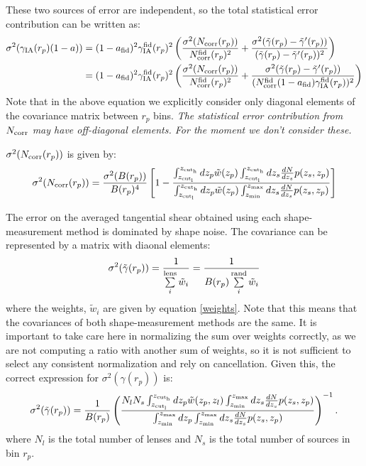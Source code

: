 \documentclass[onecolumn,amsmath,aps,fleqn, superscriptaddress]{revtex4}
\begin{document}
These two sources of error are independent, so the total statistical error contribution can be written as:
\begin{align}
\sigma^2(\gamma_{\rm IA}(r_p)(1-a)) &= (1-a_{\rm fid})^2\gamma_{\rm IA}^{\rm fid}(r_p)^2\left(\frac{\sigma^2(N_{\rm corr}(r_p))}{N_{\rm corr}^{\rm fid}(r_p)^2} + \frac{\sigma^2(\tilde{\gamma}(r_p) - \tilde{\gamma}^\prime(r_p))}{(\tilde{\gamma}(r_p) - \tilde{\gamma}^\prime(r_p))^2}\right) \nonumber \\
&= (1-a_{\rm fid})^2\gamma_{\rm IA}^{\rm fid}(r_p)^2\left(\frac{\sigma^2(N_{\rm corr}(r_p))}{N_{\rm corr}^{\rm fid}(r_p)^2} + \frac{\sigma^2(\tilde{\gamma}(r_p) - \tilde{\gamma}^\prime(r_p))}{(N_{\rm corr}^{\rm fid}(1-a_{\rm fid})\gamma_{\rm IA}^{\rm fid}(r_p))^2}\right)
\label{error}
\end{align}
Note that in the above equation we explicitly consider only diagonal elements of the covariance matrix between $r_p$ bins. {\it The statistical error contribution from $N_{\rm corr}$ may have off-diagonal elements. For the moment we don't consider these.}

$\sigma^2(N_{\rm corr}(r_p))$ is given by:
\begin{equation}
\sigma^2(N_{\rm corr}(r_p)) = \frac{\sigma^2(B(r_p))}{B(r_p)^4}\left[1-\frac{\int_{z_{\rm cut_l}}^{z_{\rm cut_h}} dz_p \tilde{w}(z_p) \int_{z_{\rm cut_l}}^{z_{\rm cut_h}} dz_s\frac{dN}{dz_s} p(z_s, z_p)}{\int_{z_{\rm cut_l}}^{z_{\rm cut_h}} dz_p  \tilde{w}(z_p) \int_{z_{\rm min}}^{z_{\rm max}} dz_s\frac{dN}{dz_s} p(z_s, z_p)}\right]
\label{Ncorr_err}
\end{equation}

The error on the averaged tangential shear obtained using each shape-measurement method is dominated by shape noise. The covariance can be represented by a matrix with diaonal elements:
\begin{equation}
\sigma^2(\tilde{\gamma}(r_p)) = \frac{1}{\sum\limits_{i}^{\rm lens} \tilde{w}_i} = \frac{1}{B(r_p)\sum\limits_{i}^{\rm rand} \tilde{w}_i}
\label{diag_corr}
\end{equation} 
where the weights, $\tilde{w}_i$ are given by equation \ref{weights}. Note that this means that the covariances of both shape-measurement methods are the same. It is important to take care here in normalizing the sum over weights correctly, as we are not computing a ratio with another sum of weights, so it is not sufficient to select any consistent normalization and rely on cancellation. Given this, the correct expression for $\sigma^2(\gamma(r_p))$ is:
\begin{equation}
\sigma^2(\tilde{\gamma}(r_p))= \frac{1}{B(r_p)} \left(\frac{N_l N_s\int_{z_{\rm cut_l}}^{z_{\rm cut_h}} dz_p \tilde{w}(z_p, z_l) \int_{z_{\rm min}}^{z_{\rm max}} dz_s \frac{dN}{dz_s}p(z_s, z_p)}{ \int_{z_{\rm min}}^{z_{\rm max}} dz_p \int_{z_{\rm min}}^{z_{\rm max}} dz_s \frac{dN}{dz_s}p(z_s, z_p)}\right)^{-1}.
\label{sum_weights}
\end{equation}
where $N_l$ is the total number of lenses and $N_s$ is the total number of sources in bin $r_p$.
\end{document}

